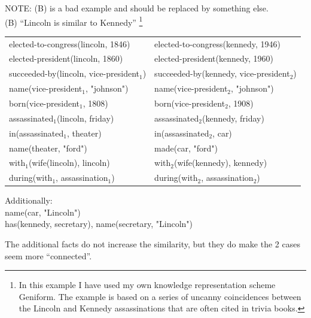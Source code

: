 NOTE:  (B) is a bad example and should be replaced by something else.\\
(B) ``Lincoln is similar to Kennedy''
\footnote{In this example I have used my own knowledge representation scheme Geniform.  The example is based on a series of uncanny coincidences between the Lincoln and Kennedy assassinations that are often cited in trivia books.}
\\
\hspace*{1cm} \begin{tabular}{l|l}
elected-to-congress(lincoln, 1846)        & elected-to-congress(kennedy, 1946)\\
elected-president(lincoln, 1860)          & elected-president(kennedy, 1960)\\
succeeded-by(lincoln, vice-president$_1$) & succeeded-by(kennedy, vice-president$_2$)\\
\hspace*{1cm} name(vice-president$_1$, "johnson") &
\hspace*{1cm} name(vice-president$_2$, "johnson")\\
\hspace*{1cm} born(vice-president$_1$, 1808) &
\hspace*{1cm} born(vice-president$_2$, 1908)\\
assassinated$_1$(lincoln, friday)         & assassinated$_2$(kennedy, friday)\\
in(assassinated$_1$, theater)             & in(assassinated$_2$, car)\\
name(theater, "ford")                     & made(car, "ford")\\
with$_1$(wife(lincoln), lincoln)          & with$_2$(wife(kennedy), kennedy)\\
\hspace*{1cm} during(with$_1$, assassination$_1$) &
\hspace*{1cm} during(with$_2$, assassination$_2$)\\
\end{tabular}

Additionally:\\
\hspace*{1cm} name(car, "Lincoln")\\
\hspace*{1cm} has(kennedy, secretary), name(secretary, "Lincoln")

The additional facts do not increase the similarity, but they do make the 2 cases seem more ``connected''.

\underconst

